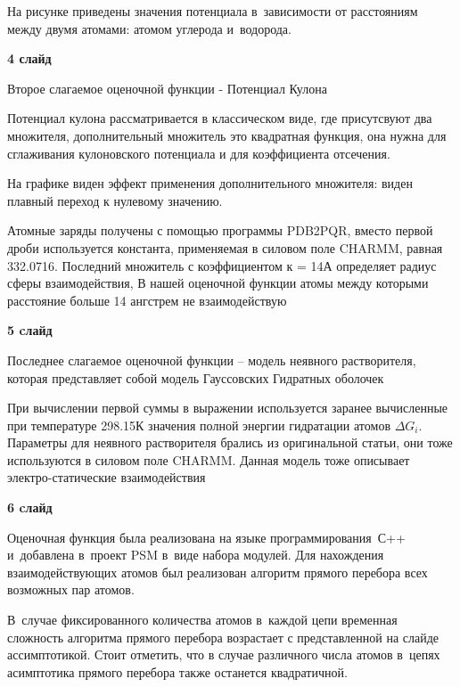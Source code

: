 \documentclass[17pt]{extarticle}
\begin{document}
На рисунке приведены значения потенциала в~зависимости от расстояниям между двумя атомами: атомом углерода и~водорода.

\vspace{+5mm}


\textbf{4 слайд}

Второе слагаемое оценочной функции - Потенциал Кулона

Потенциал кулона рассматривается в классическом виде, где присутсвуют два множителя, дополнительный множитель это квадратная функция, она нужна для сглаживания кулоновского потенциала и для коэффициента отсечения.

На графике виден эффект применения дополнительного множителя: виден плавный переход к нулевому значению.

Атомные заряды получены с помощью программы PDB2PQR, вместо первой дроби используется константа, применяемая в силовом поле CHARMM, равная 332.0716. Последний множитель с коэффициентом к = 14А определяет радиус сферы взаимодействия, В нашей оценочной функции атомы между которыми расстояние больше 14 ангстрем не взаимодействую

\vspace{+5mm}


\textbf{5 cлайд}

Последнее слагаемое оценочной функции -- модель неявного растворителя, которая представляет собой модель Гауссовских Гидратных оболочек

При вычислении первой суммы в выражении используется заранее вычисленные при температуре 298.15К значения полной энергии гидратации атомов $\Delta G_i$. Параметры для неявного растворителя брались из оригинальной статьи, они тоже используются в силовом поле CHARMM. Данная модель тоже описывает электро-статические взаимодействия

\vspace{+5mm}


\textbf{6 cлайд}

Оценочная функция была реализована на языке программирования~С++ и~добавлена в~проект PSM в~виде набора модулей. Для нахождения взаимодействующих атомов был реализован алгоритм прямого перебора всех возможных пар атомов.

В~случае фиксированного количества атомов в~каждой цепи временная сложность алгоритма прямого перебора возрастает с представленной на слайде ассимптотикой. Стоит отметить, что в случае различного числа атомов в~цепях асимптотика прямого перебора также останется квадратичной.
\end{document}
